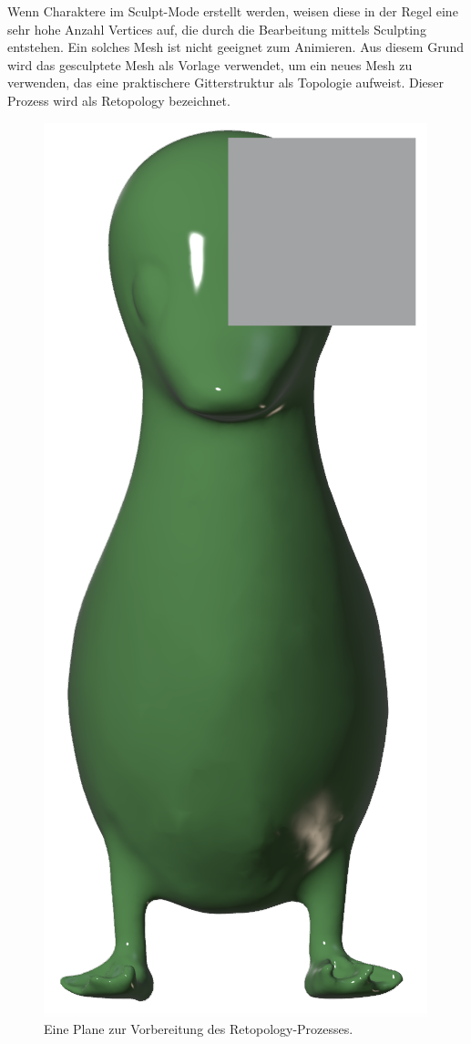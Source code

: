 \documentclass[
]{book}
\begin{document}
Wenn Charaktere im Sculpt-Mode erstellt werden, weisen diese in der
Regel eine sehr hohe Anzahl Vertices auf, die durch die Bearbeitung
mittels Sculpting entstehen. Ein solches Mesh ist nicht geeignet zum
Animieren. Aus diesem Grund wird das gesculptete Mesh als Vorlage
verwendet, um ein neues Mesh zu verwenden, das eine praktischere
Gitterstruktur als Topologie aufweist. Dieser Prozess wird als
Retopology bezeichnet.

\begin{figure}

\includegraphics{Chapters/Images/Chapter_41/41_1_Plane.png}

\caption{\label{fig-1_1}Eine Plane zur Vorbereitung des
Retopology-Prozesses.}

\end{figure}%
\end{document}
